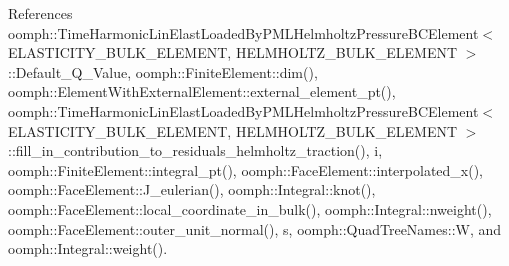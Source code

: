 References oomph\+::\+Time\+Harmonic\+Lin\+Elast\+Loaded\+By\+P\+M\+L\+Helmholtz\+Pressure\+B\+C\+Element$<$ E\+L\+A\+S\+T\+I\+C\+I\+T\+Y\+\_\+\+B\+U\+L\+K\+\_\+\+E\+L\+E\+M\+E\+N\+T, H\+E\+L\+M\+H\+O\+L\+T\+Z\+\_\+\+B\+U\+L\+K\+\_\+\+E\+L\+E\+M\+E\+N\+T $>$\+::\+Default\+\_\+\+Q\+\_\+\+Value, oomph\+::\+Finite\+Element\+::dim(), oomph\+::\+Element\+With\+External\+Element\+::external\+\_\+element\+\_\+pt(), oomph\+::\+Time\+Harmonic\+Lin\+Elast\+Loaded\+By\+P\+M\+L\+Helmholtz\+Pressure\+B\+C\+Element$<$ E\+L\+A\+S\+T\+I\+C\+I\+T\+Y\+\_\+\+B\+U\+L\+K\+\_\+\+E\+L\+E\+M\+E\+N\+T, H\+E\+L\+M\+H\+O\+L\+T\+Z\+\_\+\+B\+U\+L\+K\+\_\+\+E\+L\+E\+M\+E\+N\+T $>$\+::fill\+\_\+in\+\_\+contribution\+\_\+to\+\_\+residuals\+\_\+helmholtz\+\_\+traction(), i, oomph\+::\+Finite\+Element\+::integral\+\_\+pt(), oomph\+::\+Face\+Element\+::interpolated\+\_\+x(), oomph\+::\+Face\+Element\+::\+J\+\_\+eulerian(), oomph\+::\+Integral\+::knot(), oomph\+::\+Face\+Element\+::local\+\_\+coordinate\+\_\+in\+\_\+bulk(), oomph\+::\+Integral\+::nweight(), oomph\+::\+Face\+Element\+::outer\+\_\+unit\+\_\+normal(), s, oomph\+::\+Quad\+Tree\+Names\+::W, and oomph\+::\+Integral\+::weight().

\mbox{\label{classoomph_1_1TimeHarmonicLinElastLoadedByPMLHelmholtzPressureBCElement_abd5ea8ff85472bc6c9d63d812142bd64}} 
